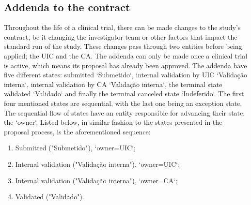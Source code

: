 \subsection{Addenda to the contract}
\label{subsec:addenda-process}
Throughout the life of a clinical trial, there can be made changes to the study's contract, be it changing the investigator team or other factors that impact the standard run of the study. These changes pass through two entities before being applied; the UIC and the CA.  
The addenda can only be made once a clinical trial is active, which means its proposal has already been approved.  
The addenda have five different states: submitted `Submetido`, internal validation by UIC `Validação interna`, internal validation by CA `Validação interna`, the terminal state validated `Validado` and finally the terminal canceled state `Indeferido`.  
The first four mentioned states are sequential, with the last one being an exception state. The sequential flow of states have an entity responsible for advancing their state, the `owner`. Listed below, in similar fashion to the states presented in the proposal process, is the aforementioned sequence:
\begin{enumerate}
    \item Submitted ("Submetido"), `owner=UIC`;
    \item Internal validation ("Validação interna"), `owner=UIC`;
    \item Internal validation ("Validação interna"), `owner=CA`;
    \item Validated ("Validado").
\end{enumerate}


